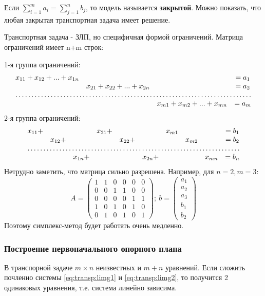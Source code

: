 \documentclass[a4paper, 14pt]{extarticle}
\numberwithin{equation}{section}
\begin{document}
Если $ \sum\limits^{m}_{i=1} a_i = \sum\limits^{n}_{j=1} b_j $, то модель называется \textbf{закрытой}. Можно показать, что любая закрытая транспортная задача имеет решение.

Транспортная задача - ЗЛП, но специфичная формой ограничений. Матрица ограничений имеет n+m строк:

1-я группа ограничений:
\begin{equation}
\label{eq:transp:limg1}
\begin{matrix}
        x_{11} + x_{12} + ... + x_{1n} & & & =a_1 \\
    & x_{21} + x_{22} + ... + x_{2n} & & = a_2 \\
    \hdotsfor{4}\\
    & & x_{m1} + x_{m2} + ... + x_{mn} & =a_m
\end{matrix}
\end{equation}
2-я группа ограничений:
\begin{equation}
\label{eq:transp:limg2}
\begin{matrix}
        x_{11} + & & & x_{21} + & & & x_{m1} & & & =b_1\\
      & x_{12} + & & & x_{22} + & & & x_{m2} & & =b_2\\
      \hdotsfor{10}\\
    & & x_{1n} + & & & x_{2n} + & & & x_{mn} & =b_n
\end{matrix}
\end{equation}
Нетрудно заметить, что матрица сильно разрешена. Например, для $n=2, m=3$:
\[ A = \begin{pmatrix}
    1 & 1 & 0 & 0 & 0 & 0\\
    0 & 0 & 1 & 1 & 0 & 0\\
    0 & 0 & 0 & 0 & 1 & 1\\
    1 & 0 & 1 & 0 & 1 & 0\\
    0 & 1 & 0 & 1 & 0 & 1
\end{pmatrix}; \ b = \begin{pmatrix}
    a_1 \\ a_2 \\ a_3 \\ b_1 \\ b_2
\end{pmatrix} \]
Поэтому симплекс-метод будет работать очень медленно.

\subsubsection{Построение первоначального опорного плана}
В транспорной задаче $ m \times n$ неизвестных и $m+n$ уравнений. Если сложить почленно системы \ref{eq:transp:limg1} и \ref{eq:transp:limg2}, то получится 2 одинаковых уравнения, т.е. система линейно зависима. 
\end{document}
